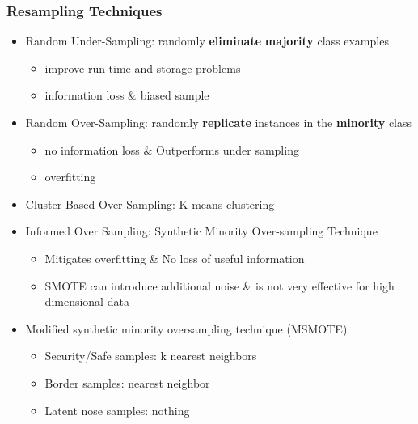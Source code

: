 \documentclass[UTF8,aspectratio=1610,10pt]{ctexbeamer}
\begin{document}
\begin{frame}
\frametitle{Resampling Techniques}
\begin{itemize}
\item Random Under-Sampling: randomly \textbf{eliminate} \textbf{majority} class examples
\begin{itemize}
  \item[\faThumbsOUp] improve run time and storage problems
  \item[\faThumbsODown] information loss \& biased sample
\end{itemize}

\item Random Over-Sampling: randomly \textbf{replicate} instances in the \textbf{minority} class 
  	\begin{itemize}
  	\item[\faThumbsOUp] no information loss \& Outperforms under sampling
  	\item[\faThumbsODown] overfitting
	\end{itemize}
	
\item Cluster-Based Over Sampling: K-means clustering
\item Informed Over Sampling: Synthetic Minority Over-sampling Technique
\begin{itemize}
  \item[\faThumbsOUp] Mitigates overfitting \& No loss of useful information
  \item[\faThumbsODown] SMOTE can introduce additional noise \& is not very effective for high dimensional data
\end{itemize}

\item Modified synthetic minority oversampling technique (MSMOTE)
\begin{itemize}
  \item Security/Safe samples: k nearest neighbors
  \item Border samples: nearest neighbor
  \item Latent nose samples: nothing
\end{itemize}
\end{itemize}
\end{frame}
\end{document}
